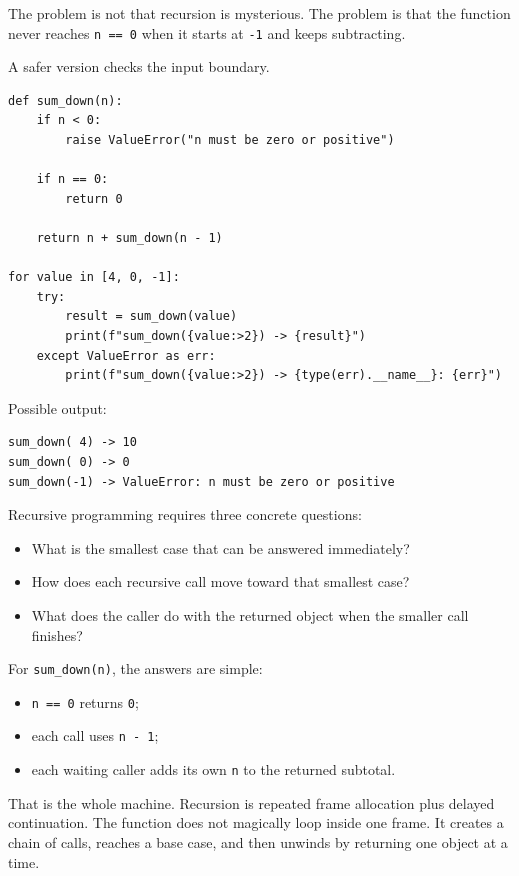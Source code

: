 The problem is not that recursion is mysterious. The problem is that the function never reaches \texttt{n == 0} when it starts at \texttt{-1} and keeps subtracting.

A safer version checks the input boundary.

\begin{verbatim}
def sum_down(n):
    if n < 0:
        raise ValueError("n must be zero or positive")

    if n == 0:
        return 0

    return n + sum_down(n - 1)

for value in [4, 0, -1]:
    try:
        result = sum_down(value)
        print(f"sum_down({value:>2}) -> {result}")
    except ValueError as err:
        print(f"sum_down({value:>2}) -> {type(err).__name__}: {err}")
\end{verbatim}

Possible output:

\begin{verbatim}
sum_down( 4) -> 10
sum_down( 0) -> 0
sum_down(-1) -> ValueError: n must be zero or positive
\end{verbatim}

Recursive programming requires three concrete questions:

\begin{itemize}
    \item What is the smallest case that can be answered immediately?
    \item How does each recursive call move toward that smallest case?
    \item What does the caller do with the returned object when the smaller call finishes?
\end{itemize}

For \texttt{sum\_down(n)}, the answers are simple:

\begin{itemize}
    \item \texttt{n == 0} returns \texttt{0};
    \item each call uses \texttt{n - 1};
    \item each waiting caller adds its own \texttt{n} to the returned subtotal.
\end{itemize}

That is the whole machine. Recursion is repeated frame allocation plus delayed continuation. The function does not magically loop inside one frame. It creates a chain of calls, reaches a base case, and then unwinds by returning one object at a time.